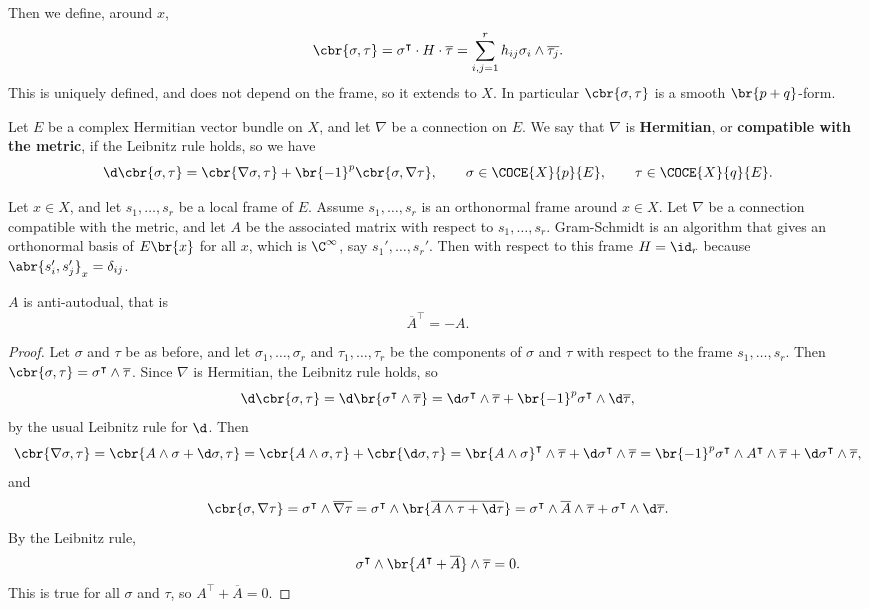 \pagebreak

Then we define, around $ x $,
$$ \cbr{\sigma, \tau} = \sigma^\intercal \cdot H \cdot \overline{\tau} = \sum_{i, j = 1}^r h_{ij}\sigma_i \wedge \overline{\tau_j}. $$
This is uniquely defined, and does not depend on the frame, so it extends to $ X $. In particular $ \cbr{\sigma, \tau} $ is a smooth $ \br{p + q} $-form.

\begin{definition}
Let $ E $ be a complex Hermitian vector bundle on $ X $, and let $ \nabla $ be a connection on $ E $. We say that $ \nabla $ is \textbf{Hermitian}, or \textbf{compatible with the metric}, if the Leibnitz rule holds, so we have
$$ \d\cbr{\sigma, \tau} = \cbr{\nabla\sigma, \tau} + \br{-1}^p\cbr{\sigma, \nabla\tau}, \qquad \sigma \in \COCE{X}{p}{E}, \qquad \tau \in \COCE{X}{q}{E}. $$
\end{definition}

Let $ x \in X $, and let $ s_1, \dots, s_r $ be a local frame of $ E $. Assume $ s_1, \dots, s_r $ is an orthonormal frame around $ x \in X $. Let $ \nabla $ be a connection compatible with the metric, and let $ A $ be the associated matrix with respect to $ s_1, \dots, s_r $. Gram-Schmidt is an algorithm that gives an orthonormal basis of $ E\br{x} $ for all $ x $, which is $ \C^\infty $, say $ s_1', \dots, s_r' $. Then with respect to this frame $ H = \id_r $ because $ \abr{s_i', s_j'}_x = \delta_{ij} $.

\begin{proposition}
$ A $ is anti-autodual, that is
$$ \overline{A}^\intercal = -A. $$
\end{proposition}

\begin{proof}
Let $ \sigma $ and $ \tau $ be as before, and let $ \sigma_1, \dots, \sigma_r $ and $ \tau_1, \dots, \tau_r $ be the components of $ \sigma $ and $ \tau $ with respect to the frame $ s_1, \dots, s_r $. Then $ \cbr{\sigma, \tau} = \sigma^\intercal \wedge \overline{\tau} $. Since $ \nabla $ is Hermitian, the Leibnitz rule holds, so
$$ \d\cbr{\sigma, \tau} = \d\br{\sigma^\intercal \wedge \overline{\tau}} = \d\sigma^\intercal \wedge \overline{\tau} + \br{-1}^p\sigma^\intercal \wedge \d\overline{\tau}, $$
by the usual Leibnitz rule for $ \d $. Then
$$ \cbr{\nabla\sigma, \tau} = \cbr{A \wedge \sigma + \d\sigma, \tau} = \cbr{A \wedge \sigma, \tau} + \cbr{\d\sigma, \tau} = \br{A \wedge \sigma}^\intercal \wedge \overline{\tau} + \d\sigma^\intercal \wedge \overline{\tau} = \br{-1}^p\sigma^\intercal \wedge A^\intercal \wedge \overline{\tau} + \d\sigma^\intercal \wedge \overline{\tau}, $$
and
$$ \cbr{\sigma, \nabla\tau} = \sigma^\intercal \wedge \overline{\nabla\tau} = \sigma^\intercal \wedge \br{\overline{A \wedge \tau + \d\tau}} = \sigma^\intercal \wedge \overline{A} \wedge \overline{\tau} + \sigma^\intercal \wedge \d\overline{\tau}. $$
By the Leibnitz rule,
$$ \sigma^\intercal \wedge \br{A^\intercal + \overline{A}} \wedge \overline{\tau} = 0. $$
This is true for all $ \sigma $ and $ \tau $, so $ A^\intercal + \overline{A} = 0 $.
\end{proof}

